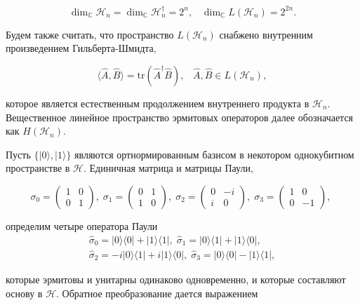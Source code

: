 \documentclass[a4paper]{report}
\begin{document}
$${\dim_\mathbb{C} \mathcal{H}_n = \dim_\mathbb{C} \mathcal{H}_n^\dagger = 2^n,\;\;\;
            \dim_\mathbb{C} L(\mathcal{H}_n) = 2^{2n}.}$$

Будем также считать, что пространство ${L(\mathcal{H}_n)}$ снабжено внутренним произведением Гильберта-Шмидта,

\begin{equation}\tag{1}\label{eq1}
    \langle\hat{A},\hat{B}\rangle = \mathrm{tr}(\hat{A}^\dagger\hat{B}),\;\;\;
    \hat{A},\hat{B} \in L(\mathcal{H}_n),
\end{equation}

\noindent которое является естественным продолжением внутреннего продукта в ${\mathcal{H}_n}$. Вещественное линейное пространство эрмитовых операторов далее обозначается как ${H(\mathcal{H}_n)}$.

\newpage

Пусть ${\{|0\rangle,|1\rangle\}}$ являются ортнормированным базисом в некотором однокубитном пространстве в ${\mathcal{H}}$. Единичная матрица и матрицы Паули,

$${
            \sigma_0 = \begin{pmatrix}1 & 0 \\ 0 & 1\end{pmatrix},\;
            \sigma_1 = \begin{pmatrix}0 & 1 \\ 1 & 0\end{pmatrix},\;
            \sigma_2 = \begin{pmatrix}0 & -i \\ i & 0\end{pmatrix},\;
            \sigma_3 = \begin{pmatrix}1 & 0 \\ 0 & -1\end{pmatrix},\;
        }$$

\noindent определим четыре оператора Паули
\begin{align*}
    \hat{\sigma}_0 = |0\rangle\langle0| + |1\rangle\langle1|,\; \hat{\sigma}_1 = |0\rangle\langle1| + |1\rangle\langle0|,     \\
    \hat{\sigma}_2 = -i|0\rangle\langle1| + i|1\rangle\langle0|,\;  \hat{\sigma}_3 = |0\rangle\langle0| - |1\rangle\langle1|,
\end{align*}

\noindent которые эрмитовы и унитарны одинаково одновременно, и которые составляют основу в ${\mathcal{H}}$. Обратное преобразование дается выражением
\end{document}
